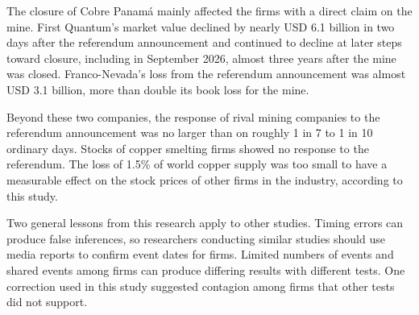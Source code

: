 \documentclass[11pt]{article}
\begin{document}
The closure of Cobre Panamá mainly affected the firms with a direct claim on the mine. First Quantum's market value declined by nearly USD 6.1 billion in two days after the referendum announcement and continued to decline at later steps toward closure, including in September 2026, almost three years after the mine was closed. Franco-Nevada's loss from the referendum announcement was almost USD 3.1 billion, more than double its book loss for the mine.

Beyond these two companies, the response of rival mining companies to the referendum announcement was no larger than on roughly 1 in 7 to 1 in 10 ordinary days. Stocks of copper smelting firms showed no response to the referendum. The loss of 1.5\% of world copper supply was too small to have a measurable effect on the stock prices of other firms in the industry, according to this study.

Two general lessons from this research apply to other studies. Timing errors can produce false inferences, so researchers conducting similar studies should use media reports to confirm event dates for firms. Limited numbers of events and shared events among firms can produce differing results with different tests. One correction used in this study suggested contagion among firms that other tests did not support.
\end{document}
